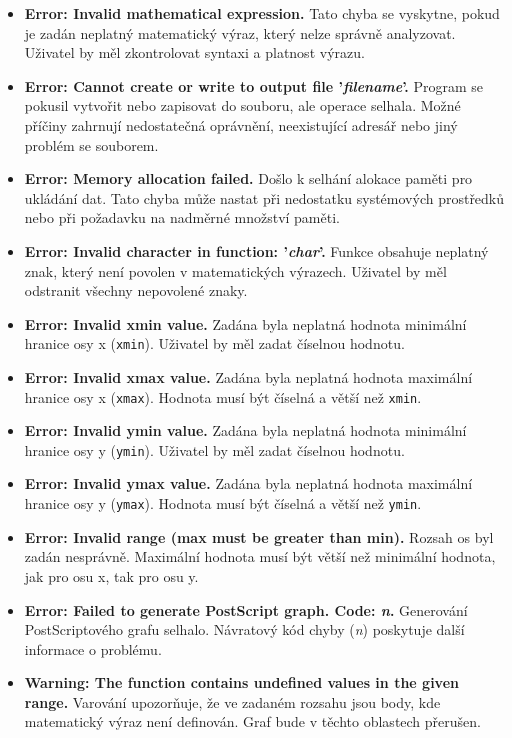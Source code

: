 \documentclass[12pt]{article} %
\begin{document}
\begin{itemize}
    \item \textbf{Error: Invalid mathematical expression.}  
    Tato chyba se vyskytne, pokud je zadán neplatný matematický výraz, který nelze správně analyzovat. Uživatel by měl zkontrolovat syntaxi a platnost výrazu.

    \item \textbf{Error: Cannot create or write to output file '\textit{filename}'.}  
    Program se pokusil vytvořit nebo zapisovat do souboru, ale operace selhala. Možné příčiny zahrnují nedostatečná oprávnění, neexistující adresář nebo jiný problém se souborem.

    \item \textbf{Error: Memory allocation failed.}  
    Došlo k selhání alokace paměti pro ukládání dat. Tato chyba může nastat při nedostatku systémových prostředků nebo při požadavku na nadměrné množství paměti.

    \item \textbf{Error: Invalid character in function: '\textit{char}'.}  
    Funkce obsahuje neplatný znak, který není povolen v matematických výrazech. Uživatel by měl odstranit všechny nepovolené znaky.

    \item \textbf{Error: Invalid xmin value.}  
    Zadána byla neplatná hodnota minimální hranice osy x (\texttt{xmin}). Uživatel by měl zadat číselnou hodnotu.

    \item \textbf{Error: Invalid xmax value.}  
    Zadána byla neplatná hodnota maximální hranice osy x (\texttt{xmax}). Hodnota musí být číselná a větší než \texttt{xmin}.

    \item \textbf{Error: Invalid ymin value.}  
    Zadána byla neplatná hodnota minimální hranice osy y (\texttt{ymin}). Uživatel by měl zadat číselnou hodnotu.

    \item \textbf{Error: Invalid ymax value.}  
    Zadána byla neplatná hodnota maximální hranice osy y (\texttt{ymax}). Hodnota musí být číselná a větší než \texttt{ymin}.

    \item \textbf{Error: Invalid range (max must be greater than min).}  
    Rozsah os byl zadán nesprávně. Maximální hodnota musí být větší než minimální hodnota, jak pro osu x, tak pro osu y.

    \item \textbf{Error: Failed to generate PostScript graph. Code: \textit{n}.}  
    Generování PostScriptového grafu selhalo. Návratový kód chyby (\textit{n}) poskytuje další informace o problému.

    \item \textbf{Warning: The function contains undefined values in the given range.}  
    Varování upozorňuje, že ve zadaném rozsahu jsou body, kde matematický výraz není definován. Graf bude v těchto oblastech přerušen.
\end{itemize}
\end{document}
